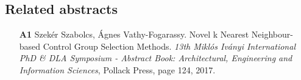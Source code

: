         \subsection*{Related abstracts}
								
		\begin{itemize}
			\item [\textbf{A1}] Szekér Szabolcs, Ágnes Vathy-Fogarassy. Novel k Nearest Neighbour-based Control Group Selection Methods. \textit{13th Miklós Iványi International PhD \& DLA Symposium - Abstract Book: Architectural, Engineering and Information Sciences}, Pollack Press, page 124, 2017.
			
			      			      			      	      	      			
		\end{itemize}